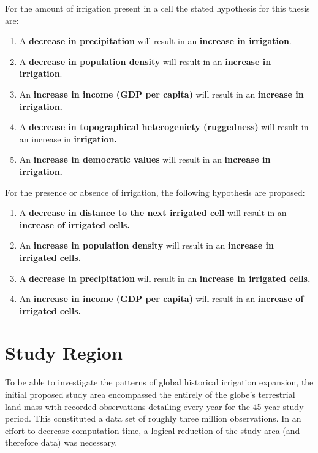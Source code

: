 \documentclass[12pt,twoside]{reedthesis}
\providecommand{\tightlist}{%
  \setlength{\itemsep}{0pt}\setlength{\parskip}{0pt}}
\begin{document}
For the amount of irrigation present in a cell the stated hypothesis for this thesis are:
\begin{enumerate}
\def\labelenumi{\arabic{enumi}.}
\tightlist
\item
  A \textbf{decrease in precipitation} will result in an \textbf{increase in irrigation}.
\item
  A \textbf{decrease in population density} will result in an \textbf{increase in irrigation}.
\item
  An \textbf{increase in income (GDP per capita)} will result in an \textbf{increase in irrigation.}
\item
  A \textbf{decrease in topographical heterogeniety (ruggedness)} will result in an increase in \textbf{irrigation.}
\item
  An \textbf{increase in democratic values} will result in an \textbf{increase in irrigation.}
\end{enumerate}
For the presence or absence of irrigation, the following hypothesis are proposed:
\begin{enumerate}
\def\labelenumi{\arabic{enumi}.}
\tightlist
\item
  A \textbf{decrease in distance to the next irrigated cell} will result in an \textbf{increase of irrigated cells.}
\item
  An \textbf{increase in population density} will result in an \textbf{increase in irrigated cells.}
\item
  A \textbf{decrease in precipitation} will result in an \textbf{increase in irrigated cells.}
\item
  An \textbf{increase in income (GDP per capita)} will result in an \textbf{increase of irrigated cells.}
\end{enumerate}
\hypertarget{studyreg}{%
\section{Study Region}\label{studyreg}}

To be able to investigate the patterns of global historical irrigation expansion, the initial proposed study area encompassed the entirely of the globe's terrestrial land mass with recorded observations detailing every year for the 45-year study period. This constituted a data set of roughly three million observations. In an effort to decrease computation time, a logical reduction of the study area (and therefore data) was necessary.
\end{document}
